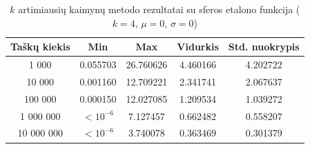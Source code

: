 \begin{table}[H]
    \centering
    \begin{tabular}{|c|c|c|c|c|}
        \hline
        \textbf{Taškų kiekis} & \textbf{Min} & \textbf{Max} & \textbf{Vidurkis} & \textbf{Std. nuokrypis} \\ \hline
        1 000        & 0.055703 & 26.760626 & 4.460166 & 4.202722 \\ \hline
        10 000       & 0.001160 & 12.709221 & 2.341741 & 2.067637 \\ \hline
        100 000      & 0.000150 & 12.027085 & 1.209534 & 1.039272 \\ \hline
        1 000 000    & $<10^{-6}$ & 7.127457 & 0.662482 & 0.558207 \\ \hline
        10 000 000   & $<10^{-6}$ & 3.740078 & 0.363469 & 0.301379 \\ \hline
    \end{tabular}
    \caption{$k$ artimiausių kaimynų metodo rezultatai su sferos etalono funkcija ($k = 4$, $\mu = 0$, $\sigma = 0$)}
\end{table}